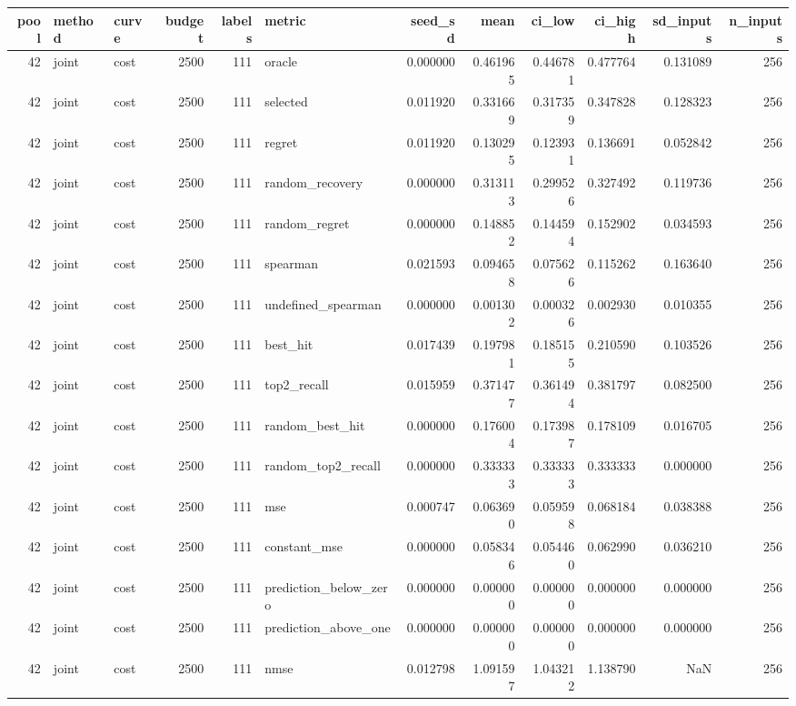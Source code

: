 \begin{tabular}{rllrrlrrrrrr}
\toprule
pool & method & curve & budget & labels & metric & seed_sd & mean & ci_low & ci_high & sd_inputs & n_inputs \\
\midrule
42 & joint & cost & 2500 & 111 & oracle & 0.000000 & 0.461965 & 0.446781 & 0.477764 & 0.131089 & 256 \\
42 & joint & cost & 2500 & 111 & selected & 0.011920 & 0.331669 & 0.317359 & 0.347828 & 0.128323 & 256 \\
42 & joint & cost & 2500 & 111 & regret & 0.011920 & 0.130295 & 0.123931 & 0.136691 & 0.052842 & 256 \\
42 & joint & cost & 2500 & 111 & random_recovery & 0.000000 & 0.313113 & 0.299526 & 0.327492 & 0.119736 & 256 \\
42 & joint & cost & 2500 & 111 & random_regret & 0.000000 & 0.148852 & 0.144594 & 0.152902 & 0.034593 & 256 \\
42 & joint & cost & 2500 & 111 & spearman & 0.021593 & 0.094658 & 0.075626 & 0.115262 & 0.163640 & 256 \\
42 & joint & cost & 2500 & 111 & undefined_spearman & 0.000000 & 0.001302 & 0.000326 & 0.002930 & 0.010355 & 256 \\
42 & joint & cost & 2500 & 111 & best_hit & 0.017439 & 0.197981 & 0.185155 & 0.210590 & 0.103526 & 256 \\
42 & joint & cost & 2500 & 111 & top2_recall & 0.015959 & 0.371477 & 0.361494 & 0.381797 & 0.082500 & 256 \\
42 & joint & cost & 2500 & 111 & random_best_hit & 0.000000 & 0.176004 & 0.173987 & 0.178109 & 0.016705 & 256 \\
42 & joint & cost & 2500 & 111 & random_top2_recall & 0.000000 & 0.333333 & 0.333333 & 0.333333 & 0.000000 & 256 \\
42 & joint & cost & 2500 & 111 & mse & 0.000747 & 0.063690 & 0.059598 & 0.068184 & 0.038388 & 256 \\
42 & joint & cost & 2500 & 111 & constant_mse & 0.000000 & 0.058346 & 0.054460 & 0.062990 & 0.036210 & 256 \\
42 & joint & cost & 2500 & 111 & prediction_below_zero & 0.000000 & 0.000000 & 0.000000 & 0.000000 & 0.000000 & 256 \\
42 & joint & cost & 2500 & 111 & prediction_above_one & 0.000000 & 0.000000 & 0.000000 & 0.000000 & 0.000000 & 256 \\
42 & joint & cost & 2500 & 111 & nmse & 0.012798 & 1.091597 & 1.043212 & 1.138790 & NaN & 256 \\

\end{tabular}

